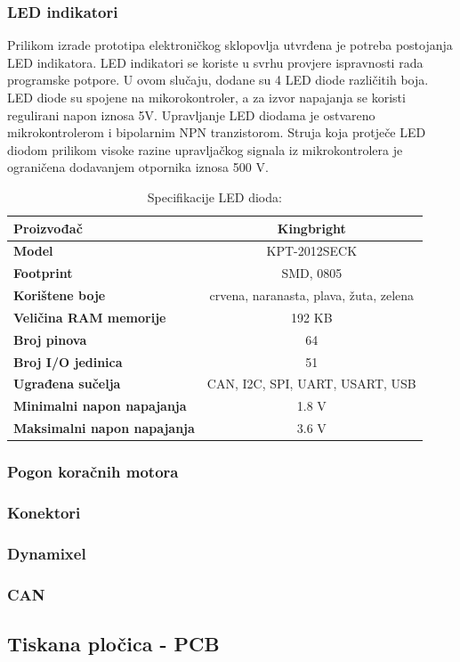 \documentclass[11pt,a4paper]{article}
\begin{document}
\subsubsection{LED indikatori}
Prilikom izrade prototipa elektroničkog sklopovlja utvrđena je potreba postojanja LED indikatora. LED indikatori se koriste u svrhu provjere ispravnosti rada programske potpore. U ovom slučaju, dodane su 4 LED diode različitih boja. LED diode su spojene na mikorokontroler, a za izvor napajanja se koristi regulirani napon iznosa 5V. Upravljanje LED diodama je ostvareno mikrokontrolerom i bipolarnim NPN tranzistorom. Struja koja protječe LED diodom prilikom visoke razine upravljačkog signala iz mikrokontrolera je ograničena dodavanjem otpornika iznosa 500 V. 

\begin{table}[H]
	\centering
	\caption{Specifikacije LED dioda: }
	\label{tab:specifikacija_MCU}
	\begin{tabular}{|l|c|}
		\hline
		\textbf{Proizvođač} & Kingbright \\ \hline 
		\textbf{Model} & KPT-2012SECK \\ \hline 
		\textbf{Footprint} & SMD, 0805  \\ \hline 
		\textbf{Korištene boje} & crvena, naranasta, plava, žuta, zelena \\ \hline 
		\textbf{Veličina RAM memorije} & 192 KB \\ \hline 
		\textbf{Broj pinova} & 64 \\ \hline 
		\textbf{Broj I/O jedinica} & 51 \\ \hline 
		\textbf{Ugrađena sučelja} & CAN, I2C, SPI, UART, USART, USB\\ \hline 
		\textbf{Minimalni napon napajanja} & 1.8 V\\ \hline 
		\textbf{Maksimalni napon napajanja} & 3.6 V\\ \hline 
	\end{tabular}
\end{table}


\subsubsection{Pogon koračnih motora}
\subsubsection{Konektori}
\subsubsection{Dynamixel}
\subsubsection{CAN}

\subsection{Tiskana pločica - PCB}
\end{document}
